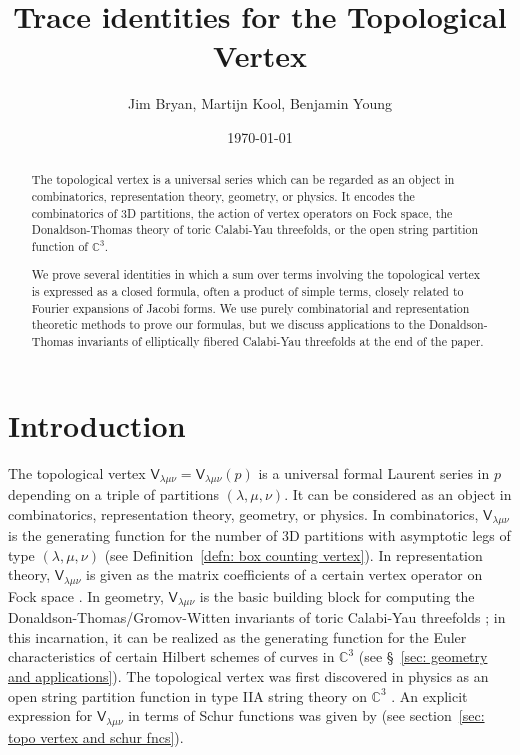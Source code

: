 \documentclass[12pt]{amsart}
\title{Trace identities for the Topological Vertex}
\author{Jim Bryan, Martijn Kool, Benjamin Young}
\date{\today}
\newcommand{\cnums} {{\mathbb C}}          %
\newcommand{\Vsf}{\mathsf{V}}
\theoremstyle{definition}
\begin{document}
\begin{abstract}
The topological vertex is a universal series which can be regarded as
an object in combinatorics, representation theory, geometry, or
physics. It encodes the combinatorics of 3D partitions, the action of
vertex operators on Fock space, the Donaldson-Thomas theory of toric
Calabi-Yau threefolds, or the open string partition function of
$\cnums^{3}$.

We prove several identities in which a sum over terms involving the
topological vertex is expressed as a closed formula, often a product
of simple terms, closely related to Fourier expansions of Jacobi
forms. We use purely combinatorial and representation theoretic
methods to prove our formulas, but we discuss applications to the
Donaldson-Thomas invariants of elliptically fibered Calabi-Yau
threefolds at the end of the paper. 
\end{abstract}

\maketitle 





\section{Introduction}\label{sec: intro}

The topological vertex $\Vsf_{\lambda \mu \nu}=\Vsf_{\lambda \mu
\nu}(p)$ is a universal formal Laurent series in $p$ depending on a
triple of partitions $(\lambda, \mu, \nu )$. It can be considered as
an object in combinatorics, representation theory, geometry, or
physics. In combinatorics, $\Vsf_{\lambda \mu \nu}$ is the generating
function for the number of 3D partitions with asymptotic legs of type
$(\lambda, \mu, \nu )$ (see Definition~\ref{defn: box counting
vertex}). In representation theory, $\Vsf_{\lambda \mu \nu}$ is given
as the matrix coefficients of a certain vertex operator on Fock space
\cite{Ok-Re-Va}. In geometry, $\Vsf_{\lambda \mu \nu}$ is the basic
building block for computing the Donaldson-Thomas/Gromov-Witten
invariants of toric Calabi-Yau threefolds \cite{MNOP1}; in this
incarnation, it can be realized as the generating function for the
Euler characteristics of certain Hilbert schemes of curves in
$\cnums^{3}$ (see \S~\ref{sec: geometry and applications}). The
topological vertex was first discovered in physics as an open string
partition function in type IIA string theory on $\cnums^{3}$
\cite{AKMV}. An explicit expression for $\Vsf_{\lambda \mu \nu}$ in
terms of Schur functions was given by \cite{Ok-Re-Va} (see
section~\ref{sec: topo vertex and schur fncs}).
\end{document}
